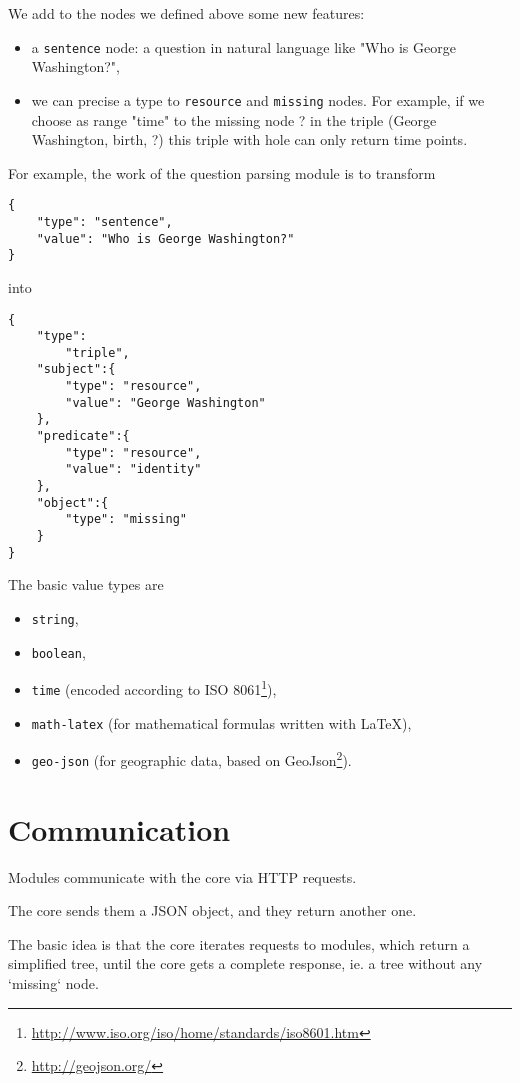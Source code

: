 We add to the nodes we defined above some new features:
\begin{itemize}
    \item a \texttt{sentence} node: a question in natural language like "Who is George Washington?",
    \item we can precise a type to \texttt{resource} and \texttt{missing} nodes. For example, if we choose as range "time" to the missing node ? in the triple (George Washington, birth, ?) this triple with hole can only return time points.
\end{itemize}

For example, the work of the question parsing module is to transform 
\begin{verbatim}
{
    "type": "sentence", 
    "value": "Who is George Washington?"
}
\end{verbatim}
into 
\begin{verbatim}
{
    "type":
        "triple",
    "subject":{
        "type": "resource",
        "value": "George Washington"
    },
    "predicate":{
        "type": "resource",
        "value": "identity"
    },
    "object":{
        "type": "missing"
    }
}
\end{verbatim}

The basic value types are 
\begin{itemize}
    \item \texttt{string},
    \item \texttt{boolean},
    \item \texttt{time} (encoded according to ISO 8061\footnote{\url{http://www.iso.org/iso/home/standards/iso8601.htm}}),
    \item \texttt{math-latex} (for mathematical formulas written with \LaTeX),
    \item \texttt{geo-json} (for geographic data, based on GeoJson\footnote{\url{http://geojson.org/}}).
\end{itemize}

\section{Communication}

Modules communicate with the core via HTTP requests.

The core sends them a JSON object, and they return another one.

The basic idea is that the core iterates requests to modules, which return a simplified tree, until the core gets a complete response, ie. a tree without any `missing` node.

